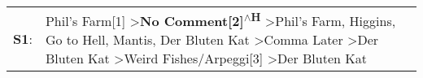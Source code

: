 \begin{supertabular}{p{0.03\textwidth}p{0.92\textwidth}}
 \textbf{S1}:  &  Phil's Farm[1]\textsuperscript{} \textgreater \enspace \textbf{No Comment[2]\textsuperscript{$\wedge$H}} \textgreater \enspace Phil's Farm\textsuperscript{}, \enspace Higgins\textsuperscript{}, \enspace Go to Hell\textsuperscript{}, \enspace Mantis\textsuperscript{}, \enspace Der Bluten Kat\textsuperscript{} \textgreater \enspace Comma Later\textsuperscript{} \textgreater \enspace Der Bluten Kat\textsuperscript{} \textgreater \enspace Weird Fishes/Arpeggi[3]\textsuperscript{} \textgreater \enspace Der Bluten Kat\textsuperscript{}  \enspace  \\
\end{supertabular}
